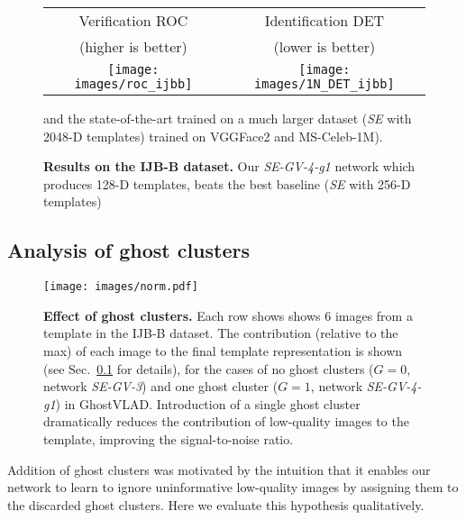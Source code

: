 \documentclass[runningheads]{llncs}
\begin{document}
\begin{figure*}[t]
\captionsetup{font=small}
\begin{center}
\begin{tabular}{c@{~~~~~}c}
Verification ROC & Identification DET \\
{\scriptsize (higher is better)} & {\scriptsize (lower is better)} \\ [0.1cm]
\texttt{[image: images/roc\_ijbb]} &
\texttt{[image: images/1N\_DET\_ijbb]}
\end{tabular}
\end{center}
\vspace{-2mm}
\caption{{\bf Results on the IJB-B dataset.} 
Our \emph{SE-GV-4-g1} network which produces 128-D templates,
beats the best baseline (\emph{SE} with 256-D templates)}
and the state-of-the-art trained on a much larger dataset
(\emph{SE} with 2048-D templates) trained on VGGFace2 and MS-Celeb-1M).
\label{fig:ijb}
\vspace{-4mm}
\end{figure*}



 



\subsection{Analysis of ghost clusters} \label{sec:visualize_ghost}


\begin{figure}[t]
   \begin{center}
         \texttt{[image: images/norm.pdf]}
   \end{center}
\caption{\textbf{Effect of ghost clusters.}
Each row shows shows 6 images from a template in the IJB-B dataset.
The contribution (relative to the max) of each image
to the final template representation is shown
(see Sec.~\ref{sec:visualize_ghost} for details),
for the cases of no ghost clusters ($G=0$, network \emph{SE-GV-3})
and one ghost cluster ($G=1$, network \emph{SE-GV-4-g1})
in GhostVLAD.
Introduction of a single ghost cluster dramatically reduces
the contribution of low-quality images to the template,
improving the signal-to-noise ratio.
}
    \label{fig:score}
\end{figure}

Addition of ghost clusters was motivated by the intuition
that it enables our network to learn to ignore uninformative
low-quality images by assigning them to the discarded ghost clusters.
Here we evaluate this hypothesis qualitatively.
\end{document}
